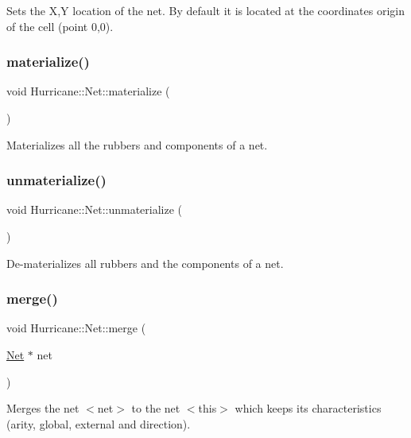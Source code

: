 Sets the X,Y location of the net. By default it is located at the coordinates origin of the cell (point 0,0). \mbox{\label{classHurricane_1_1Net_ae46f7e4a9b00b265c06cb6e0ee00b806}} 
\subsubsection{\texorpdfstring{materialize()}{materialize()}}
{\footnotesize\ttfamily void Hurricane\+::\+Net\+::materialize (\begin{DoxyParamCaption}{ }\end{DoxyParamCaption})}

Materializes all the rubbers and components of a net. \mbox{\label{classHurricane_1_1Net_a9e53a3d54b61f7081263e6d7b4fa81b9}} 
\subsubsection{\texorpdfstring{unmaterialize()}{unmaterialize()}}
{\footnotesize\ttfamily void Hurricane\+::\+Net\+::unmaterialize (\begin{DoxyParamCaption}{ }\end{DoxyParamCaption})}

De-\/materializes all rubbers and the components of a net. \mbox{\label{classHurricane_1_1Net_a442f62d23364805f39816cd543284886}} 
\subsubsection{\texorpdfstring{merge()}{merge()}}
{\footnotesize\ttfamily void Hurricane\+::\+Net\+::merge (\begin{DoxyParamCaption}\item[{\mbox{\hyperlink{classHurricane_1_1Net}{Net}} $\ast$}]{net }\end{DoxyParamCaption})}

Merges the net {\ttfamily $<$net$>$} to the net {\ttfamily $<$this$>$} which keeps its characteristics (arity, global, external and direction).

